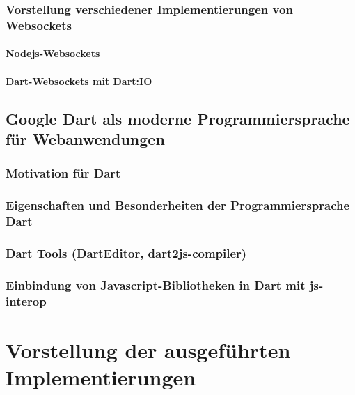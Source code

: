 \subsection{Vorstellung verschiedener  Implementierungen von Websockets}

\subsubsection{Nodejs-Websockets}\label{s.Nodejs-Websockets}

\subsubsection{Dart-Websockets mit Dart:IO}

\section{Google Dart als moderne Programmiersprache für Webanwendungen}\label{s.Google Dart als moderne Programmiersprache für Webanwendungen}


\subsection{Motivation für Dart}

\subsection{Eigenschaften und Besonderheiten der Programmiersprache Dart}\label{s.Eigenschaften und Besonderheiten der Programmiersprache Dart}

\subsection{Dart Tools (DartEditor, dart2js-compiler)}\label{s.Dart Tools (DartEditor, dart2js-compiler)}


\subsection{Einbindung von Javascript-Bibliotheken in Dart mit js-interop}\label{s.Einbindung von Javascript-Bibliotheken in Dart mit js-interop}


\chapter{Vorstellung der ausgeführten Implementierungen}\label{s.Implementierungen}

